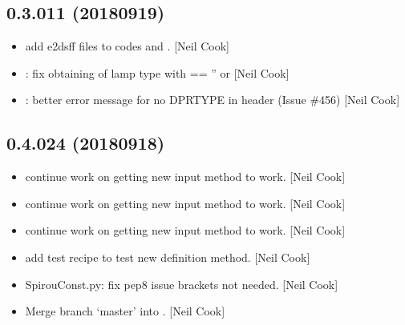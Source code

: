 \documentclass[a4paper,10pt,english]{report}
\begin{document}
\subsection{0.3.011 (2018\sphinxhyphen{}09\sphinxhyphen{}19)}
\label{\detokenize{misc/changelog:id339}}\begin{itemize}
\item {} 
 \sphinxhyphen{} add e2dsff files to  codes and .
{[}Neil Cook{]}

\item {} 
: fix obtaining of lamp type with 
 == ” or  {[}Neil Cook{]}

\item {} 
: better error message for no DPRTYPE in
header (Issue \#456) {[}Neil Cook{]}

\end{itemize}


\subsection{0.4.024 (2018\sphinxhyphen{}09\sphinxhyphen{}18)}
\label{\detokenize{misc/changelog:id340}}\begin{itemize}
\item {} 
 \sphinxhyphen{} continue work on getting new input method to work.
{[}Neil Cook{]}

\item {} 
 \sphinxhyphen{} continue work on getting new input method to work.
{[}Neil Cook{]}

\item {} 
 \sphinxhyphen{} continue work on getting new input method to work.
{[}Neil Cook{]}

\item {} 
 \sphinxhyphen{} add test recipe to test new definition method. {[}Neil
Cook{]}

\item {} 
SpirouConst.py: fix pep8 issue \sphinxhyphen{} brackets not needed. {[}Neil Cook{]}

\item {} 
Merge branch ‘master’ into . {[}Neil Cook{]}

\end{itemize}
\end{document}
